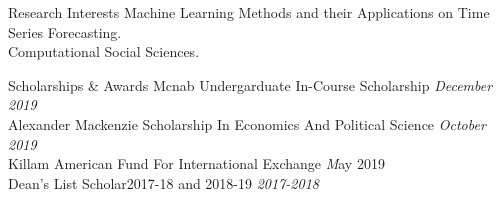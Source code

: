 \documentclass{resume} %
\begin{document}
\begin{rSection}{Research Interests}
Machine Learning Methods and their Applications on Time Series Forecasting.
\\Computational Social Sciences.
\end{rSection}


\begin{rSection}{Scholarships \& Awards}
{Mcnab Undergarduate In-Course Scholarship} \hfill {\em December 2019} \\
{Alexander Mackenzie Scholarship In Economics And Political Science} \hfill {\em October 2019} \\
{Killam American Fund For International Exchange} \hfill{\emph May 2019} \\
{Dean's List Scholar2017-18 and 2018-19} \hfill {\em 2017-2018}
\end{rSection}
\end{document}
